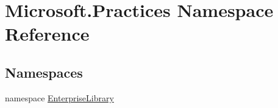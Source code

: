 \hypertarget{namespaceMicrosoft_1_1Practices}{}\section{Microsoft.\+Practices Namespace Reference}
\label{namespaceMicrosoft_1_1Practices}
\subsection*{Namespaces}
\begin{DoxyCompactItemize}
\item 
namespace \hyperlink{namespaceMicrosoft_1_1Practices_1_1EnterpriseLibrary}{Enterprise\+Library}
\end{DoxyCompactItemize}
